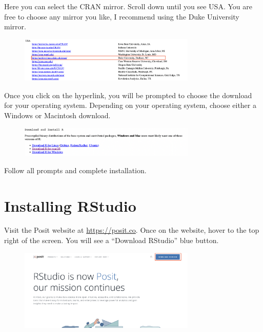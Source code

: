 \documentclass[
  letterpaper,
  DIV=11,
  numbers=noendperiod]{scrreprt}
\begin{document}
Here you can select the CRAN mirror. Scroll down until you see USA. You
are free to choose any mirror you like, I recommend using the Duke
University mirror.

\begin{figure}

{\centering \includegraphics[width=0.75\textwidth,height=\textheight]{./images/DukeCRAN.jpeg}

}

\end{figure}

Once you click on the hyperlink, you will be prompted to choose the
download for your operating system. Depending on your operating system,
choose either a Windows or Macintosh download.

\begin{figure}

{\centering \includegraphics[width=0.75\textwidth,height=\textheight]{./images/OSDownload.jpeg}

}

\end{figure}

Follow all prompts and complete installation.

\hypertarget{installing-rstudio}{%
\section*{Installing RStudio}\label{installing-rstudio}}


Visit the Posit website at \url{https://posit.co}. Once on the website,
hover to the top right of the screen. You will see a ``Download
RStudio'' blue button.

\begin{figure}

{\centering \includegraphics[width=0.75\textwidth,height=\textheight]{./images/RStudio1.jpeg}

}

\end{figure}
\end{document}
